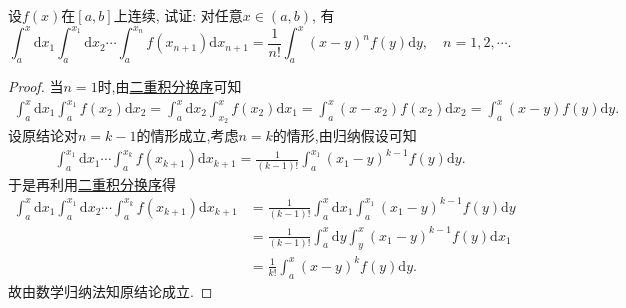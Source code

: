 \documentclass[../../main.tex]{subfiles}
\begin{document}
\begin{proposition}\label{proposition:多重积分递推公式}
设$f(x)$在$[a,b]$上连续, 试证: 对任意$x \in (a,b)$, 有
\[
\int_{a}^{x} \mathrm{d}x_1 \int_{a}^{x_1} \mathrm{d}x_2 \cdots \int_{a}^{x_n} f(x_{n + 1}) \mathrm{d}x_{n + 1} = \frac{1}{n!} \int_{a}^{x} (x - y)^n f(y) \mathrm{d}y, \quad n = 1,2,\cdots.
\]
\end{proposition}
\begin{proof}
当$n=1$时,由\hyperref[theorem:二重积分换序]{二重积分换序}可知
\begin{align*}
\int_a^x \mathrm{d}x_1 \int_a^{x_1} f(x_2) \mathrm{d}x_2 = \int_a^x \mathrm{d}x_2 \int_{x_2}^x f(x_2) \mathrm{d}x_1 = \int_a^x (x-x_2) f(x_2) \mathrm{d}x_2 = \int_a^x (x-y) f(y) \mathrm{d}y.
\end{align*}
设原结论对$n=k-1$的情形成立,考虑$n=k$的情形,由归纳假设可知
\begin{align*}
\int_a^{x_1} \mathrm{d}x_1 \cdots \int_a^{x_k} f(x_{k+1}) \mathrm{d}x_{k+1} = \frac{1}{(k-1)!} \int_a^{x_1} (x_1-y)^{k-1} f(y) \mathrm{d}y.
\end{align*}
于是再利用\hyperref[theorem:二重积分换序]{二重积分换序}得
\begin{align*}
\int_a^x \mathrm{d}x_1 \int_a^{x_1} \mathrm{d}x_2 \cdots \int_a^{x_k} f(x_{k+1}) \mathrm{d}x_{k+1} &= \frac{1}{(k-1)!} \int_a^x \mathrm{d}x_1 \int_a^{x_1} (x_1-y)^{k-1} f(y) \mathrm{d}y \\
&= \frac{1}{(k-1)!} \int_a^x \mathrm{d}y \int_y^x (x_1-y)^{k-1} f(y) \mathrm{d}x_1 \\
&= \frac{1}{k!} \int_a^x (x-y)^k f(y) \mathrm{d}y.
\end{align*}
故由数学归纳法知原结论成立.
\end{proof}
\end{document}
